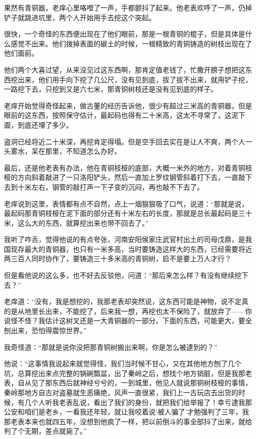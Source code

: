 果然有青铜器，老痒心里咯噔了一声，手都颤抖了起来。他老表欢呼了一声，仍掉铲子就跳进坑里，两个人开始用手去挖这个突起。

很快，一个奇怪的东西便出现在了他们眼前，那是一根青铜的棍子，但是具体是什么感觉不出来。他们拨掉表面的碳土的时候，一根精致的青铜铸造的树枝出现在了他们面前。

他们两个大喜过望，从来没见过这东西啊，那肯定值老钱了，忙撒开膀子想把这东西挖出来，他们用手向下挖了几公尺，没有见到底，拔了拔不出来，就用铲子挖，一路挖下去，只挖到又是六七米，那青铜树枝还是没有见到底的样子。

老痒开始觉得奇怪起来，做古董的经历告诉他，很少有超过三米高的青铜器，但是眼前的这东西，按照保守估计，最起码也得有二十米高，这太不寻常了，这泥下面，到底还埋了多少。

盗洞已经将近二十米深，再挖肯定得塌。但是空手回去实在是让人不爽，两个人一头雾水，呆在那里，不知道怎么办好。

最后，还是他老表有办法，他在青铜枝桠的底部，大概一米外的地方，对着青铜枝桠的方向斜着敲进了一只洛阳铲头，然后一直加上罗纹钢管斜着打下去，一直敲下去到十米左右，钢管的敲打声一下子变的沉闷，再也敲不下去了。

老痒说到这里，表情都有点不自然，点上一烟狠狠吸了口气，说道：“那就是说，最起码那青铜枝桠在泥下面的部分还有十米左右的长度，那就是总长最起码是三十米，这么大的东西，就算挖出来也带不回去了。”

我听了咋舌，觉得他说的有点夸张，河南安阳侯家庄武官村出土的司母戊鼎，是我国现存最大的青铜器，也只有一米多高，当时要铸造这样大的东西，已经需要将近两三百人同时协作了，要铸造三十多米高的青铜树，启不是要上万人才行？

但是看他说的这么多，也不好去反驳他，问道：“那后来怎么样？有没有继续挖下去？”

老痒道：“没有，我是想挖的，我那老表却突然说，这东西可能是神物，说不定真的是从地里长出来，不能挖了，后来我一想，再挖也太不保险了，就放弃了——你说怪不怪？我估计这树叉还是一大青铜器的一部分，下面的东西，可能更大，要全刨出来，恐怕得震惊世界。”

我奇怪道：“那就是说你没把那青铜树搬出来啊，你是怎么被逮到的？”

他说：“这事情我说起来就觉得怪，我们当时候不甘心，又在其他地方刨了几个坑，总算挖出来点完整的锅碗瓢盆，出了秦岭之后，想找个地方销脏，但是我那老表，自从见了那东西后就神经兮兮的，一到城里，他见人就说那铜树枝桠的事情，秦岭那地方自古对盗墓就生恶痛绝，风声一直很紧，我们上一古玩店去出货的时候，有几个人听我老表乱说，看出了我们的身份，就把我们给举报了！幸亏逮我那公安和咱们是老乡，一看我还年轻，就让我咬着说‘被人骗了’才勉强判了三年，我那老表本来也就四五年，没想到他疯了一样，把以前倒斗的事全部抖了出来，就给判了个无期，差点就毙了。”

